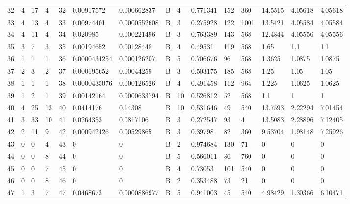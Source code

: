\begin{latin}
\begin{longtable}{lllllllllllllll}
	32  & 4  & 17  & 4  & 32  & 0.00917572     & 0.000662837    & B & 4  & 0.771341 & 152  & 360  & 14.5515 & 4.05618 & 4.05618 \\
	33  & 4  & 13  & 4  & 33  & 0.00974401     & 0.0000552608   & B & 3  & 0.275928 & 122  & 1001 & 13.5421 & 4.05584 & 4.05584 \\
	34  & 4  & 11  & 4  & 34  & 0.020985       & 0.000221496    & B & 3  & 0.763389 & 143  & 568  & 12.4844 & 4.05556 & 4.05556 \\
	35  & 3  & 7   & 3  & 35  & 0.00194652     & 0.00128448     & B & 4  & 0.49531  & 119  & 568  & 1.65    & 1.1     & 1.1     \\
	36  & 1  & 1   & 1  & 36  & 0.0000434254   & 0.000126207    & B & 5  & 0.706676 & 96   & 568  & 1.3625  & 1.0875  & 1.0875  \\
	37  & 2  & 3   & 2  & 37  & 0.000195652    & 0.00044259     & B & 3  & 0.503175 & 185  & 568  & 1.25    & 1.05    & 1.05    \\
	38  & 1  & 1   & 1  & 38  & 0.0000435076   & 0.000126526    & B & 4  & 0.491458 & 112  & 964  & 1.225   & 1.0625  & 1.0625  \\
	39  & 1  & 2   & 1  & 39  & 0.00142164     & 0.0000633794   & B & 10 & 0.526812 & 52   & 568  & 1.1     & 1       & 1       \\
	40  & 4  & 25  & 13 & 40  & 0.0414176      & 0.14308        & B & 10 & 0.531646 & 49   & 540  & 13.7593 & 2.22294 & 7.01454 \\
	41  & 3  & 33  & 10 & 41  & 0.0264353      & 0.0817106      & B & 3  & 0.272547 & 93   & 4    & 13.5083 & 2.28896 & 7.12405 \\
	42  & 2  & 11  & 9  & 42  & 0.000942426    & 0.00529865     & B & 3  & 0.39798  & 82   & 360  & 9.53704 & 1.98148 & 7.25926 \\
	43  & 0  & 0   & 4  & 43  & 0              & 0              & B & 2  & 0.974684 & 130  & 71   & 0       & 0       & 0       \\
	44  & 0  & 0   & 8  & 44  & 0              & 0              & B & 5  & 0.566011 & 86   & 760  & 0       & 0       & 0       \\
	45  & 0  & 0   & 7  & 45  & 0              & 0              & B & 4  & 0.73053  & 101  & 540  & 0       & 0       & 0       \\
	46  & 0  & 0   & 8  & 46  & 0              & 0              & B & 2  & 0.353488 & 73   & 21   & 0       & 0       & 0       \\
	47  & 1  & 3   & 7  & 47  & 0.0468673      & 0.0000886977   & B & 5  & 0.941003 & 45   & 540  & 4.98429 & 1.30366 & 6.10471 \\

\end{longtable}
\end{latin}
